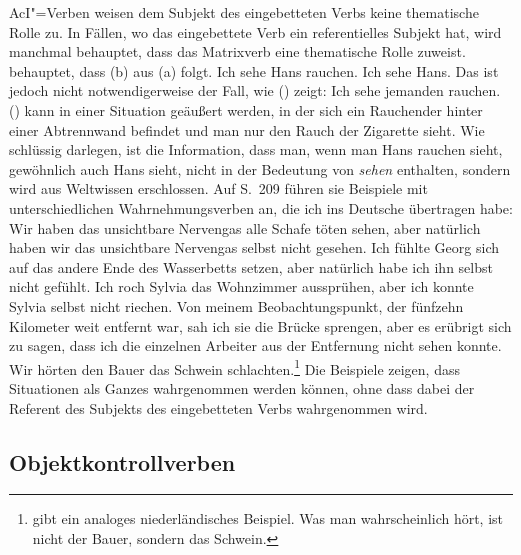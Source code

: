 \noindent
\label{page-start-aci-verbs-role}%
AcI"=Verben weisen dem Subjekt des eingebetteten Verbs keine thematische Rolle zu.
In Fällen, wo das eingebettete Verb ein referentielles Subjekt hat, wird manchmal
behauptet, dass das Matrixverb eine thematische Rolle zuweist.
\citet[]{Eisenberg94a} \zb behauptet, dass
(b) aus (a) folgt.
\eal
\ex{}
Ich sehe Hans rauchen.
\ex 
Ich sehe Hans.
\zl
Das ist jedoch nicht notwendigerweise der Fall, wie () zeigt:
\ea 
Ich sehe jemanden rauchen.
\z
() kann in einer Situation geäußert werden, in der sich ein Rauchender hinter einer Abtrennwand befindet
und man nur den Rauch der Zigarette sieht.
Wie \citet{KT76a} schlüssig darlegen, ist die Information, 
dass man, wenn man Hans rauchen sieht, gewöhnlich auch Hans sieht, 
nicht in der Bedeutung von \emph{sehen} enthalten, sondern wird
aus Weltwissen erschlossen.
Auf S.~209 führen sie Beispiele mit unterschiedlichen Wahrnehmungsverben an, die ich
ins Deutsche übertragen habe:
\eal
\label{ex-AcI-Verben-und-Rollen}
\ex Wir haben das unsichtbare Nervengas alle Schafe töten sehen, aber natürlich haben
      wir das unsichtbare Nervengas selbst nicht gesehen.
%
\ex Ich fühlte Georg sich auf das andere Ende des Wasserbetts setzen, aber
      natürlich habe ich ihn selbst nicht gefühlt.
%
\ex Ich roch Sylvia das Wohnzimmer aussprühen, aber ich konnte Sylvia selbst nicht riechen.
%
\ex Von meinem Beobachtungspunkt, der fünfzehn Kilometer weit entfernt war,
      sah ich sie die Brücke sprengen, aber es erübrigt sich zu sagen, dass
      ich die einzelnen Arbeiter aus der Entfernung nicht sehen konnte.
\ex Wir hörten den Bauer das Schwein schlachten.\footnote{
         gibt ein analoges niederländisches
        Beispiel. Was man wahrscheinlich hört, ist nicht der Bauer, sondern das Schwein.
      }
\zl
Die Beispiele zeigen, dass Situationen als Ganzes wahrgenommen werden können, ohne dass dabei
der Referent des Subjekts des eingebetteten Verbs wahrgenommen wird.%
\label{page-end-aci-verbs-role}%

\subsection{Objektkontrollverben}
\label{sec-obj-control-phen}

